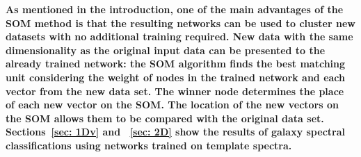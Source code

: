      \textbf{As mentioned in the introduction, one of the main advantages of the SOM method  is that the resulting networks can be used to cluster new datasets with no additional training required.
     New data with the same dimensionality as the original input data can be presented to the already trained network: the SOM algorithm finds the best matching unit considering the weight of nodes in the trained network and each vector from the new data set.
     The winner node determines the place of each new vector on the SOM.
     The location of the new vectors on the SOM allows them to be compared with the original data set. 
     Sections~\ref{sec: 1Dv} and ~\ref{sec: 2D} show the results of galaxy spectral classifications using networks trained on template spectra.}
     
